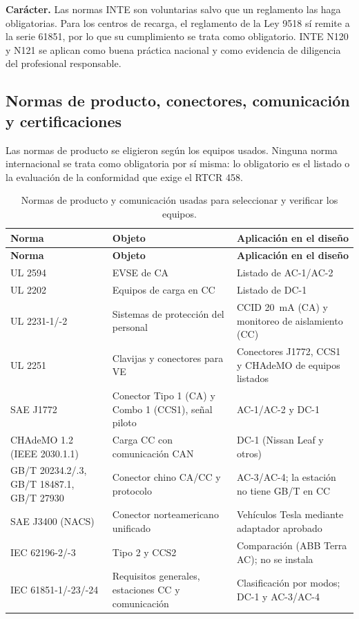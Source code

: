 \textbf{Carácter.} Las normas INTE son voluntarias salvo que un reglamento las haga obligatorias. Para los centros de recarga, el reglamento de la Ley 9518 sí remite a la serie 61851, por lo que su cumplimiento se trata como obligatorio. INTE N120 y N121 se aplican como buena práctica nacional y como evidencia de diligencia del profesional responsable.

\subsection{Normas de producto, conectores, comunicación y certificaciones}
Las normas de producto se eligieron según los equipos usados. Ninguna norma internacional se trata como obligatoria por sí misma: lo obligatorio es el listado o la evaluación de la conformidad que exige el RTCR 458.
{\small
\begin{longtable}{L{3.6cm}L{5.0cm}L{6.4cm}}
\caption{Normas de producto y comunicación usadas para seleccionar y verificar los equipos.}\label{tab:normasprod}\\
\toprule
\textbf{Norma} & \textbf{Objeto} & \textbf{Aplicación en el diseño}\\
\midrule\endfirsthead
\toprule
\textbf{Norma} & \textbf{Objeto} & \textbf{Aplicación en el diseño}\\
\midrule\endhead
UL 2594 & EVSE de CA & Listado de AC-1/AC-2 \cite{autelAC}\\
UL 2202 & Equipos de carga en CC & Listado de DC-1 \cite{autelDC}\\
UL 2231-1/-2 & Sistemas de protección del personal & CCID 20~mA (CA) y monitoreo de aislamiento (CC)\\
UL 2251 & Clavijas y conectores para VE & Conectores J1772, CCS1 y CHAdeMO de equipos listados\\
SAE J1772 & Conector Tipo 1 (CA) y Combo 1 (CCS1), señal piloto & AC-1/AC-2 y DC-1\\
CHAdeMO 1.2 (IEEE 2030.1.1) & Carga CC con comunicación CAN & DC-1 (Nissan Leaf y otros)\\
GB/T 20234.2/.3, GB/T 18487.1, GB/T 27930 & Conector chino CA/CC y protocolo & AC-3/AC-4; la estación no tiene GB/T en CC \cite{mdac}\\
SAE J3400 (NACS) & Conector norteamericano unificado & Vehículos Tesla mediante adaptador aprobado\\
IEC 62196-2/-3 & Tipo 2 y CCS2 & Comparación (ABB Terra AC); no se instala \cite{abbTAC}\\
IEC 61851-1/-23/-24 & Requisitos generales, estaciones CC y comunicación & Clasificación por modos; DC-1 y AC-3/AC-4\\

\end{longtable}}
